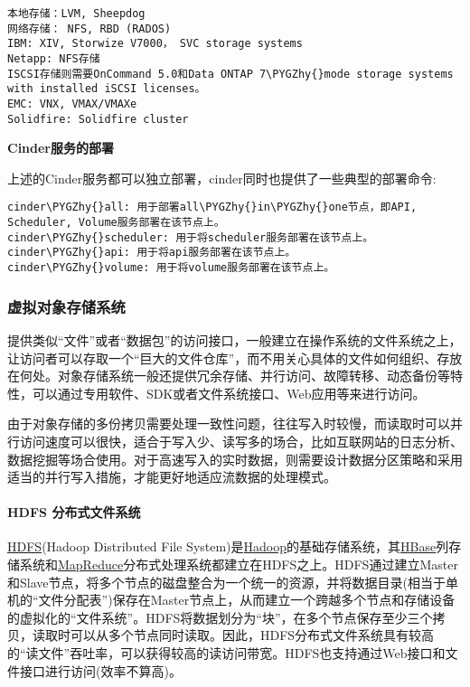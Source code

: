 \documentclass[letterpaper,10pt,english]{sphinxmanual}
\def\PYGZhy{\char`\-}
\begin{document}
\begin{Verbatim}[commandchars=\\\{\}]
本地存储：LVM, Sheepdog
网络存储： NFS, RBD (RADOS)
IBM: XIV, Storwize V7000， SVC storage systems
Netapp: NFS存储
ISCSI存储则需要OnCommand 5.0和Data ONTAP 7\PYGZhy{}mode storage systems with installed iSCSI licenses。
EMC: VNX, VMAX/VMAXe
Solidfire: Solidfire cluster
\end{Verbatim}

\textbf{Cinder服务的部署}

上述的Cinder服务都可以独立部署，cinder同时也提供了一些典型的部署命令:

\begin{Verbatim}[commandchars=\\\{\}]
cinder\PYGZhy{}all: 用于部署all\PYGZhy{}in\PYGZhy{}one节点，即API, Scheduler, Volume服务部署在该节点上。
cinder\PYGZhy{}scheduler: 用于将scheduler服务部署在该节点上。
cinder\PYGZhy{}api: 用于将api服务部署在该节点上。
cinder\PYGZhy{}volume: 用于将volume服务部署在该节点上。
\end{Verbatim}


\subsubsection{虚拟对象存储系统}
\label{gispark_cloud:_u865a_u62df_u5bf9_u8c61_u5b58_u50a8_u7cfb_u7edf}
提供类似“文件”或者“数据包”的访问接口，一般建立在操作系统的文件系统之上，让访问者可以存取一个“巨大的文件仓库”，而不用关心具体的文件如何组织、存放在何处。对象存储系统一般还提供冗余存储、并行访问、故障转移、动态备份等特性，可以通过专用软件、SDK或者文件系统接口、Web应用等来进行访问。

由于对象存储的多份拷贝需要处理一致性问题，往往写入时较慢，而读取时可以并行访问速度可以很快，适合于写入少、读写多的场合，比如互联网站的日志分析、数据挖掘等场合使用。对于高速写入的实时数据，则需要设计数据分区策略和采用适当的并行写入措施，才能更好地适应流数据的处理模式。


\paragraph{HDFS 分布式文件系统}
\label{gispark_cloud:HDFS-_u5206_u5e03_u5f0f_u6587_u4ef6_u7cfb_u7edf}
\href{http://hadoop.apache.org/docs/current/hadoop-project-dist/hadoop-hdfs/HdfsUserGuide.html}{HDFS}(Hadoop
Distributed File
System)是\href{http://hadoop.apache.org/}{Hadoop}的基础存储系统，其\href{http://hbase.apache.org/}{HBase}列存储系统和\href{http://hadoop.apache.org/docs/current/hadoop-mapreduce-client/hadoop-mapreduce-client-core/MapReduceTutorial.html}{MapReduce}分布式处理系统都建立在HDFS之上。HDFS通过建立Master和Slave节点，将多个节点的磁盘整合为一个统一的资源，并将数据目录(相当于单机的“文件分配表”)保存在Master节点上，从而建立一个跨越多个节点和存储设备的虚拟化的“文件系统”。HDFS将数据划分为“块”，在多个节点保存至少三个拷贝，读取时可以从多个节点同时读取。因此，HDFS分布式文件系统具有较高的“读文件”吞吐率，可以获得较高的读访问带宽。HDFS也支持通过Web接口和文件接口进行访问(效率不算高)。
\end{document}
